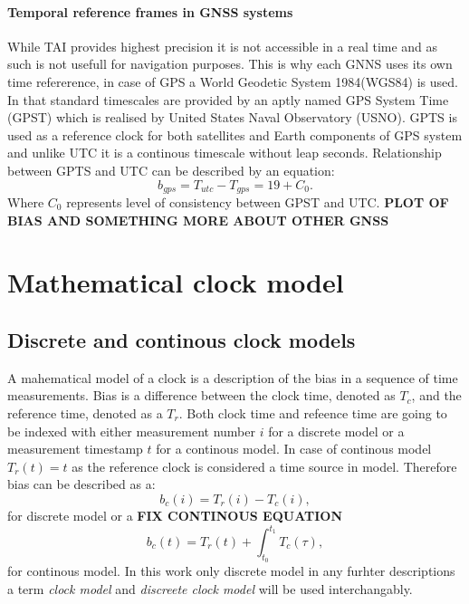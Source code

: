 \paragraph{Temporal reference frames in GNSS systems}
While TAI provides highest precision it is not accessible in a real time and as such is 
not usefull for navigation purposes.
This is why each GNNS uses its own time refererence, in case of GPS a World Geodetic System
1984(WGS84) is used. In that standard timescales are provided by an aptly named GPS System Time
(GPST) which is realised by United States Naval Observatory (USNO). 
GPTS is used as a reference clock for both satellites and Earth components of GPS system and 
unlike UTC it is a continous timescale without leap seconds.
Relationship between GPTS and UTC can be described by an equation:
\begin{equation}
	b_{gps} = T_{utc} - T_{gps} = 19 + C_{0}.
\end{equation}
Where $C_{0}$ represents level of consistency between GPST and UTC.
\textbf{PLOT OF BIAS AND SOMETHING MORE ABOUT OTHER GNSS}
\section{Mathematical clock model}

\subsection{Discrete and continous clock models}
A mahematical model of a clock is a description of the bias in a sequence of time measurements.
Bias is a difference between the clock time, denoted as $T_{c}$, and the reference time,
denoted as a $T_{r}$. Both clock time and refeence time are going to be indexed with either
measurement number $i$ for a discrete model or a measurement timestamp  $t$ for a continous 
model. In case of continous model $T_{r}(t)=t$ as the reference clock is considered a
time source in model. Therefore bias can be described as a:
\begin{equation}
	b_{c}(i) = T_{r}(i) - T_{c}(i),
\end{equation}
for discrete model or a \textbf{FIX CONTINOUS EQUATION}
\begin{equation}
	b_{c}(t) = T_{r}(t) + \int_{t_0}^{t_1}T_{c}(\tau),
\end{equation}
for continous model.
In this work only discrete model in any furhter descriptions a term \emph{clock model} and
\emph{discreete clock model} will be used interchangably.



